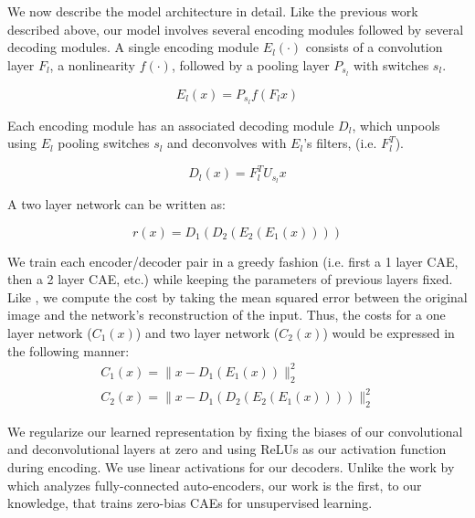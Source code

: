 \documentclass{article} \usepackage{iclr2015,times}
\begin{document}
We now describe the model architecture in detail. Like the previous work described above, our model involves several encoding modules followed by several decoding modules. A single encoding module $E_{l}(\cdot)$ consists of a convolution layer $F_{l}$, a nonlinearity $f(\cdot)$, followed by a pooling layer $P_{s_l}$ with switches $s_l$.

\begin{equation}
E_{l}(x) = P_{s_l}f(F_{l}x)
\label{eq:encoder}
\end{equation}

Each encoding module has an associated decoding module $D_{l}$, which unpools using $E_{l}$ pooling switches $s_l$ and deconvolves with $E_{l}$'s filters, (i.e. $F_{l}^T$).

\begin{equation}
D_{l}(x) = F_{l}^TU_{s_l}x
\label{eq:decoder}
\end{equation}

A two layer network can be written as:

\begin{equation}
r(x) = D_{1}(D_{2}(E_{2}(E_{1}(x))))
\label{eq:reconstruction}
\end{equation}

We train each encoder/decoder pair in a greedy fashion (i.e. first a 1 layer CAE, then a 2 layer CAE, etc.) while keeping the parameters of previous layers fixed. Like \citet{zeiler2011adaptive}, we compute the cost by taking the mean squared error between the original image and the network's reconstruction of the input. Thus, the costs for a one layer network ($C_1(x)$) and two layer network ($C_2(x)$) would be expressed in the following manner:
\begin{gather}
C_1(x) = \| x - D_{1}(E_{1}(x)) \|_{2}^{2} \\
C_2(x) = \| x - D_{1}(D_{2}(E_{2}(E_{1}(x)))) \|_{2}^{2}
\label{eq:layer_cost}
\end{gather}

We regularize our learned representation by fixing the biases of our convolutional and deconvolutional layers at zero and using ReLUs as our activation function during encoding. We use linear activations for our decoders. Unlike the work by \citet{memisevic2014zero} which analyzes fully-connected auto-encoders, our work is the first, to our knowledge, that trains zero-bias CAEs for unsupervised learning.
\end{document}
